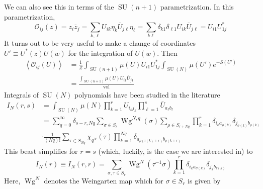 \documentclass[a4paper,11pt]{article}
\theoremstyle{definition}
\DeclareMathOperator{\SU}{SU}
\DeclareMathOperator{\vol}{vol}
\DeclareMathOperator{\Wg}{Wg}
\newcommand{\OO}{\mathcal O}
\begin{document}
We can also see this in terms of the $\SU(n+1)$ parametrization.
In this parametrization, 
\begin{equation}
  \OO_{ij}(z) = z_i \bar z_j = \sum_{k,\ell} U_{ik} \eta_k \bar U_{j\ell} \eta_{\ell} = \sum_{k\ell} \delta_{k 1}\delta_{\ell 1} U_{ik}\bar U_{j\ell} = U_{i1}U^*_{1j}
\end{equation}
It turns out to be very useful to make a change of coordinates $U' \equiv U^*(z)U(w)$ for the integration of $U(w)$.
Then
\begin{equation}
  \begin{split} 
    \left\langle \OO_{ij}(U) \right\rangle &= \frac{1}{Z} \int_{\SU(n+1)}\mu(U) U_{i1}U^*_{1j} \int_{\SU(N)} \mu(U') e^{-S(U')} \\
    &= \frac{\int_{\SU(n+1)}\mu(U) U_{i1}\bar U_{j1}}{\vol}
  \end{split}
  \label{eq:toy_one_pt_from_SU}
\end{equation}
Integrals of $\SU(N)$ polynomials have been studied in the literature \cite{Borisenko_Voloshyn_Chelnokov}
\begin{equation}
  \begin{split} 
    I_N(r,s) &= \int_{\SU(N)} \mu(N) \prod_{k=1}^r U_{i_kj_k} \prod_{\ell = 1}^s \bar U_{a_{\ell} b_{\ell}} \\
    &= \sum_{q = 0}^{\infty} \delta_{s-r, Nq}\sum_{\sigma \in S_r} \Wg^{N,q}(\sigma)\sum_{\rho\in S_{r+ Nq}}\prod_{k=1}^r \delta_{i_ka_{\rho(k)}}\delta_{j_{\sigma(k)}b_{\rho(k)}}\\
    &\cdot \frac{1}{(Nq)!} \sum_{\tau \in S_{Nq}} \chi_{q^N}(\tau) \prod_{k=1}^{Nq} \delta_{a_{\rho(\tau(k) + r)}b_{\rho(k + r)}}
  \end{split}
\end{equation}
This beast simplifies for $r = s$ (which, luckily, is the case we are interested in) to 
\begin{equation}
  I_N(r) \equiv I_N(r,r) = \sum_{\sigma,\tau \in S_r} \Wg^N(\tau^{-1}\sigma)\prod_{k=1}^r\delta_{i_ka_{\sigma(k)}}\delta_{j_kb_{\tau(k)}}
  \label{eq:SUN_poly_int}
\end{equation}
Here, $\Wg^N$ denotes the Weingarten map which for $\sigma \in S_r$ is given by
\end{document}
